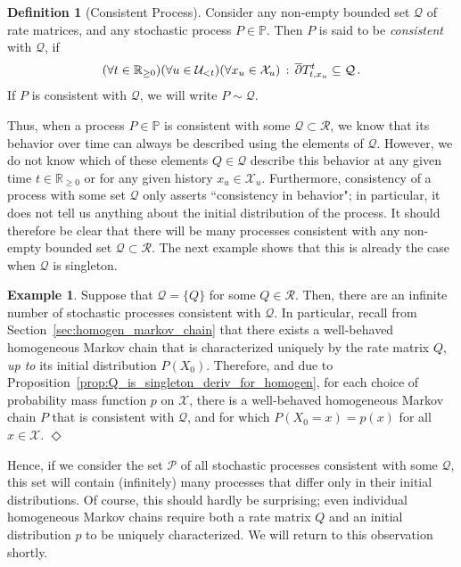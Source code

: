 \documentclass[10pt,a4paper]{paper}
\theoremstyle{definition}
\newtheorem{exmp}{Example}%
\newtheorem{definition}{Definition}
\newcommand{\reals}{\mathbb{R}}
\newcommand{\realsnonneg}{\reals_{\geq 0}}
\newcommand{\states}{\mathcal{X}}
\newcommand{\processes}{\mathbb{P}}
\newcommand{\rateset}{\mathcal{Q}}
\newcommand{\exampleend}{\hfill$\Diamond$}
\begin{document}
\begin{definition}[Consistent Process]\label{def:consistent_process}
Consider any non-empty bounded set $\rateset$ of rate matrices, and any stochastic process $P\in\processes$. Then $P$ is said to be \emph{consistent} with $\rateset$, if
\begin{equation*}
(\forall t\in\realsnonneg)(\forall u\in\mathcal{U}_{<t})(\forall x_u\in\states_u)\,:\, \smash{\overline{\partial}}T_{t,x_u}^t \subseteq \rateset\,.
\end{equation*}
If $P$ is consistent with $\rateset$, we will write $P\sim\rateset$.
\end{definition}

Thus, when a process $P\in\processes$ is consistent with some $\rateset\subset\mathcal{R}$, we know that its behavior over time can always be described using the elements of $\rateset$. However, we do not know which of these elements $Q\in\rateset$ describe this behavior at any given time  $t\in\realsnonneg$ or for any given history $x_u\in\states_u$. Furthermore, consistency of a process with some set $\rateset$ only asserts ``consistency in behavior"; in particular, it does not tell us anything about the initial distribution of the process. It should therefore be clear that there will be many processes consistent with any non-empty bounded set $\rateset\subset\mathcal{R}$. The next example shows that this is already the case when $\rateset$ is singleton.

\begin{exmp}\label{example:singleton_infinite_consistent}
Suppose that $\rateset=\{Q\}$ for some $Q\in\mathcal{R}$. Then, there are an infinite number of stochastic processes consistent with $\rateset$. In particular, recall from Section~\ref{sec:homogen_markov_chain} that there exists a well-behaved homogeneous Markov chain that is characterized uniquely by the rate matrix $Q$, \emph{up to} its initial distribution $P(X_0)$. Therefore, and due to Proposition~\ref{prop:Q_is_singleton_deriv_for_homogen}, for each choice of probability mass function $p$ on $\states$, there is a well-behaved homogeneous Markov chain $P$ that is consistent with $\rateset$, and for which $P(X_0=x)=p(x)$ for all $x\in\states$.
\exampleend
\end{exmp}

Hence, if we consider the set $\mathcal{P}$ of all stochastic processes consistent with some $\rateset$, this set will contain (infinitely) many processes that differ only in their initial distributions. Of course, this should hardly be surprising; even individual homogeneous Markov chains require both a rate matrix $Q$ and an initial distribution $p$ to be uniquely characterized. We will return to this observation shortly.
\end{document}
